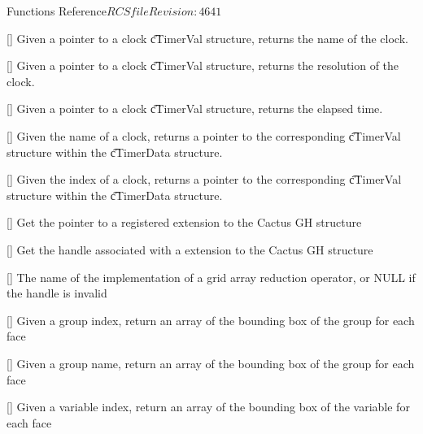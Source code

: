 \begin{cactuspart}{ Functions Reference}{$RCSfile$}{$Revision: 4641 $}
\begin{Lentry}
\item[\code{CCTK\_GetClockName}] [\pageref{CCTK-GetClockName}]
  Given a pointer to a clock {\t cTimerVal} structure, returns the name
  of the clock.

\item[\code{CCTK\_GetClockResolution}] [\pageref{CCTK-GetClockResolution}]
  Given a pointer to a clock {\t cTimerVal} structure, returns the resolution
  of the clock.

\item[\code{CCTK\_GetClockSeconds}] [\pageref{CCTK-GetClockSeconds}]
  Given a pointer to a clock {\t cTimerVal} structure, returns the elapsed time.

\item[\code{CCTK\_GetClockValue}] [\pageref{CCTK-GetClockValue}]
  Given the name of a clock, returns a pointer to the corresponding
  {\t cTimerVal} structure within the {\t cTimerData} structure.

\item[\code{CCTK\_GetClockValueI}] [\pageref{CCTK-GetClockValueI}]
  Given the index of a clock, returns a pointer to the corresponding
  {\t cTimerVal} structure within the {\t cTimerData} structure.

\item[\code{CCTK\_GHExtension}] [\pageref{CCTK-GHExtension}]
  Get the pointer to a registered extension to the Cactus GH structure

\item[\code{CCTK\_GHExtensionHandle}] [\pageref{CCTK-GHExtensionHandle}]
  Get the handle associated with a extension to the Cactus GH structure

\item[\code{CCTK\_GridArrayReductionOperator}] [\pageref{CCTK-GridArrayReductionOperator}]
     The name of the implementation of a grid array reduction operator, or NULL if the handle is invalid

\item[\code{CCTK\_GroupbboxGI}] [\pageref{CCTK-GroupbboxGI}]
  Given a group index, return an array of the bounding box
  of the group for each face

\item[\code{CCTK\_GroupbboxGN}] [\pageref{CCTK-GroupbboxGN}]
  Given a group name, return an array of the bounding box
  of the group for each face

\item[\code{CCTK\_GroupbboxVI}] [\pageref{CCTK-GroupbboxVI}]
  Given a variable index, return an array of the bounding box
  of the variable for each face


\end{Lentry}
\end{cactuspart}
